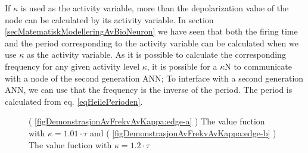	If $\kappa$ is used as the activity variable, more than the depolarization value of the node can be calculated by its activity variable. 
	In section \ref{secMatematiskModelleringAvBioNeuron} we have seen that both the firing time and the period corresponding to the activity variable can be calculated when we use $\kappa$ as the activity variable.
	As it is possible to calculate the corresponding frequency for any given activity level $\kappa$, it is possible for a $\kappa$N to communicate with a node of the second generation ANN;
		To interface with a second generation ANN, we can use that the frequency is the inverse of the period. 
	The period is calculated from eq. \eqref{eqHeilePerioden}.


\begin{figure}[hbt!p] 
	\centering
	\caption{ 	( \ref{figDemonstrasjonAvFrekvAvKappa:edge-a} ) The value fuction with $\kappa=1.01\cdot\tau$ and   
				( \ref{figDemonstrasjonAvFrekvAvKappa:edge-b} ) The value fuction with $\kappa=1.2\cdot\tau$
			} %
	\label{figEdgeTransmission}
\end{figure}




	
